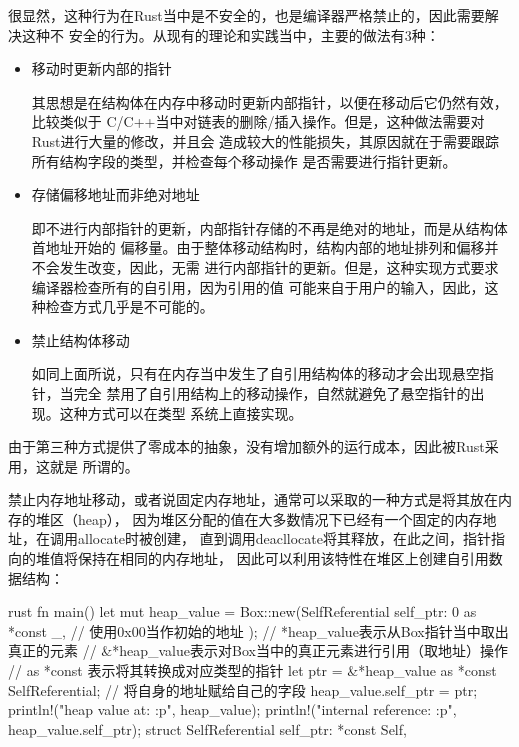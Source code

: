 很显然，这种行为在Rust当中是不安全的，也是编译器严格禁止的，因此需要解决这种不
安全的行为。从现有的理论和实践当中，主要的做法有3种：
\begin{itemize}
  \item 移动时更新内部的指针

  其思想是在结构体在内存中移动时更新内部指针，以便在移动后它仍然有效，比较类似于
  C/C++当中对链表的删除/插入操作。但是，这种做法需要对Rust进行大量的修改，并且会
  造成较大的性能损失，其原因就在于需要跟踪所有结构字段的类型，并检查每个移动操作
  是否需要进行指针更新。

  \item 存储偏移地址而非绝对地址

  即不进行内部指针的更新，内部指针存储的不再是绝对的地址，而是从结构体首地址开始的
  偏移量。由于整体移动结构时，结构内部的地址排列和偏移并不会发生改变，因此，无需
  进行内部指针的更新。但是，这种实现方式要求编译器检查所有的自引用，因为引用的值
  可能来自于用户的输入，因此，这种检查方式几乎是不可能的。

  \item 禁止结构体移动

  如同上面所说，只有在内存当中发生了自引用结构体的移动才会出现悬空指针，当完全
  禁用了自引用结构上的移动操作，自然就避免了悬空指针的出现。这种方式可以在类型
  系统上直接实现。
\end{itemize}

由于第三种方式提供了零成本的抽象，没有增加额外的运行成本，因此被Rust采用，这就是
所谓的。

禁止内存地址移动，或者说固定内存地址，通常可以采取的一种方式是将其放在内存的堆区（heap），
因为堆区分配的值在大多数情况下已经有一个固定的内存地址，在调用allocate时被创建，
直到调用deacllocate将其释放，在此之间，指针指向的堆值将保持在相同的内存地址，
因此可以利用该特性在堆区上创建自引用数据结构：
\begin{code-block}{rust}
fn main() {
    let mut heap_value = Box::new(SelfReferential {
        self_ptr: 0 as *const _, // 使用0x00当作初始的地址
    });
    // *heap_value表示从Box指针当中取出真正的元素
    // &*heap_value表示对Box当中的真正元素进行引用（取地址）操作
    // as *const 表示将其转换成对应类型的指针
    let ptr = &*heap_value as *const SelfReferential;
    // 将自身的地址赋给自己的字段
    heap_value.self_ptr = ptr;
    println!("heap value at: {:p}", heap_value);
    println!("internal reference: {:p}", heap_value.self_ptr);
}
struct SelfReferential {
    self_ptr: *const Self,
}
\end{code-block}

